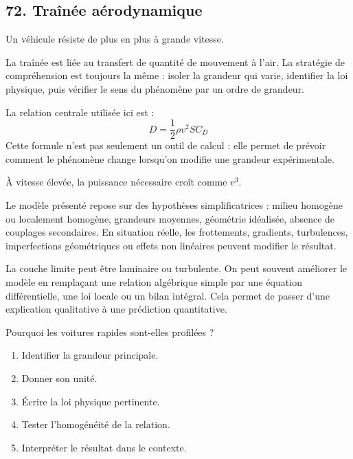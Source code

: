 \documentclass[11pt,a4paper]{article}
\begin{document}
\subsection{72. Traînée aérodynamique}

\begin{exemplebox}
Un véhicule résiste de plus en plus à grande vitesse.
\end{exemplebox}

\begin{methodebox}
La traînée est liée au transfert de quantité de mouvement à l'air.
La stratégie de compréhension est toujours la même : isoler la grandeur qui varie, identifier la loi physique, puis vérifier le sens du phénomène par un ordre de grandeur.
\end{methodebox}

\begin{theorembox}
La relation centrale utilisée ici est :
\[
D=\frac12\rho v^2SC_D
\]
Cette formule n'est pas seulement un outil de calcul : elle permet de prévoir comment le phénomène change lorsqu'on modifie une grandeur expérimentale.
\end{theorembox}

\begin{odgbox}
À vitesse élevée, la puissance nécessaire croît comme $v^3$.
\end{odgbox}

\begin{attentionbox}
Le modèle présenté repose sur des hypothèses simplificatrices : milieu homogène ou localement homogène, grandeurs moyennes, géométrie idéalisée, absence de couplages secondaires. En situation réelle, les frottements, gradients, turbulences, imperfections géométriques ou effets non linéaires peuvent modifier le résultat.
\end{attentionbox}

\begin{approfondissementbox}
La couche limite peut être laminaire ou turbulente.
On peut souvent améliorer le modèle en remplaçant une relation algébrique simple par une équation différentielle, une loi locale ou un bilan intégral. Cela permet de passer d'une explication qualitative à une prédiction quantitative.
\end{approfondissementbox}

\begin{exercicebox}
Pourquoi les voitures rapides sont-elles profilées ?
\begin{enumerate}
  \item Identifier la grandeur principale.
  \item Donner son unité.
  \item Écrire la loi physique pertinente.
  \item Tester l'homogénéité de la relation.
  \item Interpréter le résultat dans le contexte.
\end{enumerate}
\end{exercicebox}
\end{document}
